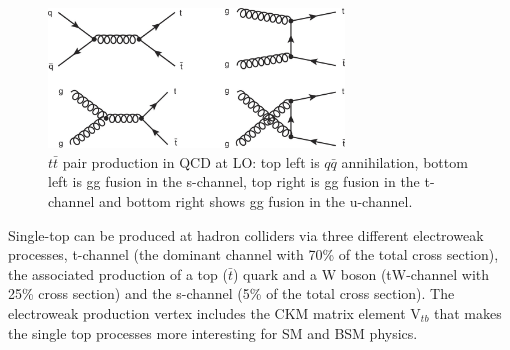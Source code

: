 \begin{figure}[h]
\centering
\includegraphics[width=0.7\textwidth]{fig/chapt2/ttbar_productions.jpg}
\caption{\label{fig:ttbar_prod}$t\bar{t}$ pair production in QCD at LO: top left is $q\bar{q}$ annihilation, bottom left is gg fusion in the s-channel, top right is gg fusion in the t-channel and bottom right shows gg fusion in the u-channel.}
\end{figure}
Single-top can be produced at hadron colliders via three different electroweak processes, t-channel (the dominant channel with 70\% of the total cross section), the associated production of a top ($\bar{t}$) quark and a W boson (tW-channel with 25\% cross section) and the s-channel (5\% of the total cross section). The electroweak production vertex includes the CKM matrix element V$_{tb}$ that makes the single top processes more interesting for SM and BSM physics.
